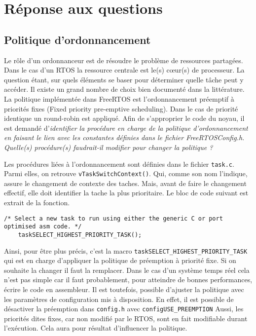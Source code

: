 \section{Réponse aux questions}

\subsection{Politique d'ordonnancement} \label{ordonnancement}
Le rôle d'un ordonnanceur est de résoudre le problème de ressources partagées.
Dans le cas d'un RTOS la ressource centrale est le(s) cœur(s) de processeur.
La question étant, sur quels éléments se baser pour déterminer quelle tâche peut y accéder.
Il existe un grand nombre de choix bien documenté dans la littérature.
La politique implémentée dans FreeRTOS est l'ordonnancement préemptif à priorités fixes (Fixed priority pre-emptive scheduling).
Dans le cas de priorité identique un round-robin est appliqué.
Afin de s'approprier le code du noyau, il est demandé d'\textit{identifier la procédure en charge de la politique d’ordonnancement en faisant le lien avec les constantes définies dans le fichier FreeRTOSConfig.h.
Quelle(s) procédure(s) faudrait-il modifier pour changer la politique ?}
\gap

Les procédures liées à l'ordonnancement sont définies dans le fichier \texttt{task.c}.
Parmi elles, on retrouve \texttt{vTaskSwitchContext()}.
Qui, comme son nom l'indique, assure le changement de contexte des taches.
Mais, avant de faire le changement effectif, elle doit identifier la tache la plus prioritaire.
Le bloc de code suivant est extrait de la fonction.
\begin{lstlisting}[style=CStyle]
    /* Select a new task to run using either the generic C or port optimised asm code. */
    taskSELECT_HIGHEST_PRIORITY_TASK();
\end{lstlisting}
Ainsi, pour être plus précis, c'est la macro \texttt{taskSELECT\_HIGHEST\_PRIORITY\_TASK} qui est en charge d'appliquer la politique de préemption à priorité fixe.
Si on souhaite la changer il faut la remplacer.
Dans le cas d'un système temps réel cela n'est pas simple car il faut probablement, pour atteindre de bonnes performances, écrire le code en assembleur.
Il est toutefois, possible d'ajuster la politique avec les paramètres de configuration mis à disposition.
En effet, il est possible de désactiver la préemption dans \texttt{config.h} avec \texttt{configUSE\_PREEMPTION}
Aussi, les priorités dites fixes, car non modifié par le RTOS, sont en fait modifiable durant l'exécution.
Cela aura pour résultat d'influencer la politique.

